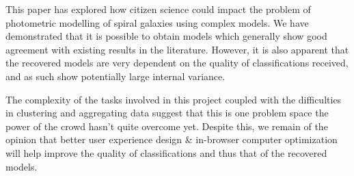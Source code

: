\documentclass[../main.tex]{subfiles}
\begin{document}
\label{sec:conclusions}
This paper has explored how citizen science could impact the problem of photometric modelling of spiral galaxies using complex models. We have demonstrated that it is possible to obtain models which generally show good agreement with existing results in the literature. However, it is also apparent that the recovered models are very dependent on the quality of classifications received, and as such show potentially large internal variance.

The complexity of the tasks involved in this project coupled with the difficulties in clustering and aggregating data suggest that this is one problem space the power of the crowd hasn't quite overcome yet. Despite this, we remain of the opinion that better user experience design \& in-browser computer optimization will help improve the quality of classifications and thus that of the recovered models.
\end{document}
